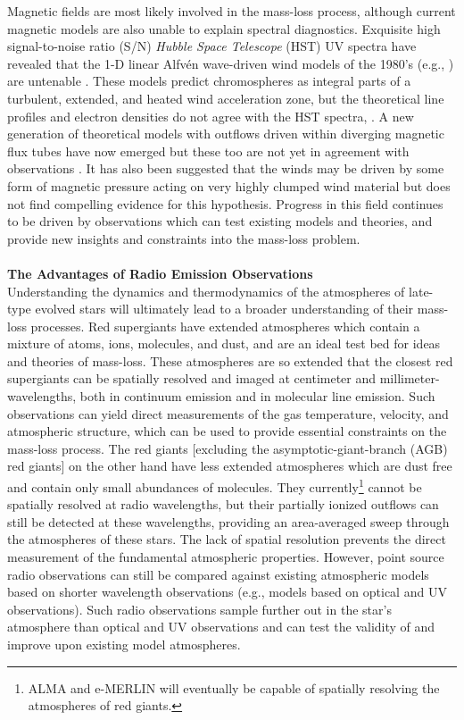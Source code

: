Magnetic fields are most likely involved in the mass-loss process, although current magnetic models are also unable to explain spectral diagnostics. Exquisite high signal-to-noise ratio (S/N) \textit{Hubble Space Telescope} (HST) UV spectra have revealed that the 1-D linear Alfv\'en wave-driven wind models of the 1980’s (e.g., \citealt{hartmann_1980,harper_1988}) are untenable \citep{harper_2001}. These models predict chromospheres as integral parts of a turbulent, extended, and heated wind acceleration zone, but the theoretical line profiles and electron densities do not agree with the HST spectra, \cite[e.g.,][]{judge_1998}. A new generation of theoretical models with outflows driven within diverging magnetic flux tubes have now emerged \citep{falceta_2006, suzuki_2007} but these too are not yet in agreement with observations \citep{crowley_2009}. It has also been suggested that the winds may be driven by some form of magnetic pressure acting on very highly clumped wind material \citep{eaton_2008} but \cite{harper_2010} does not find compelling evidence for this hypothesis. Progress in this field continues to be driven by observations which can test existing models and theories, and provide new insights and constraints into the mass-loss problem.\\
\\
\textbf{The Advantages of Radio Emission Observations}\\
Understanding the dynamics and thermodynamics of the atmospheres of late-type evolved stars will ultimately lead to a broader understanding of their mass-loss processes. Red supergiants have extended atmospheres which contain a mixture of atoms, ions, molecules, and dust, and are an ideal test bed for ideas and theories of mass-loss. These atmospheres are so extended that the closest red supergiants can be spatially resolved and imaged at centimeter and millimeter-wavelengths, both in continuum emission and in molecular line emission. Such observations can yield direct measurements of the gas temperature, velocity, and atmospheric structure, which can be used to provide essential constraints on the mass-loss process. The red giants [excluding the  asymptotic-giant-branch (AGB) red giants] on the other hand have less extended atmospheres which are dust free and contain only small abundances of molecules. They currently\footnote{ALMA and e-MERLIN will eventually be capable of spatially resolving the atmospheres of red giants.} cannot be spatially resolved at radio wavelengths, but their partially ionized outflows can still be detected at these wavelengths, providing an area-averaged sweep through the atmospheres of these stars. The lack of spatial resolution prevents the direct measurement of the fundamental atmospheric properties. However, point source radio observations can still be compared against existing atmospheric models based on shorter wavelength observations (e.g., models based on optical and UV observations). Such radio observations sample further out in the star's atmosphere than optical and UV observations and can test the validity of and improve upon existing model atmospheres. 

